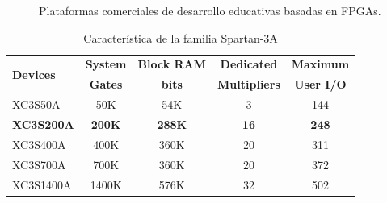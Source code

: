 \documentclass[conference]{IEEEtran}
\begin{document}
\lipsum[3-4]

\begin{figure}[!t]
  \centering
  \hfil
  \hfil
  \caption{Plataformas comerciales de desarrollo educativas basadas en FPGAs.}
  \label{fig:board-fpga}
\end{figure}

\lipsum[6]

\begin{table}[!t]
\renewcommand{\arraystretch}{1.3}
\caption{Característica de la familia Spartan-3A}
\label{tab:char-fpga}
\centering
\begin{tabular}{|l|c|c|c|c|}
\hline
\multirow{2}{*}{\textbf{Devices}} & \textbf{System} & \textbf{Block RAM} & \textbf{Dedicated} &  \textbf{Maximum} \\
 & \textbf{Gates} & \textbf{bits} & \textbf{Multipliers} & \textbf{User I/O} \\
\hline
XC3S50A & 50K & 54K & 3 & 144 \\
\hline
\textbf{XC3S200A} & \textbf{200K} & \textbf{288K} & \textbf{16} & \textbf{248} \\
\hline
XC3S400A & 400K & 360K & 20 & 311 \\
\hline
XC3S700A & 700K & 360K & 20 & 372 \\
\hline
XC3S1400A & 1400K & 576K & 32 & 502 \\
\hline
\end{tabular}
\end{table}
\end{document}
